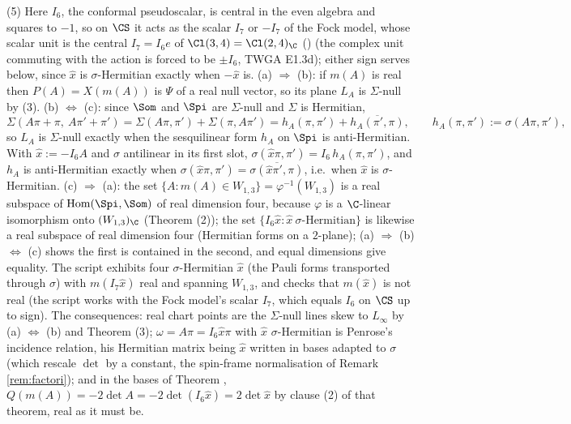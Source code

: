 (5) Here $I_6$, the conformal pseudoscalar, is central in the even algebra and squares to $-1$, so on $\CS$ it acts as the scalar $I_7$ or $-I_7$ of the Fock model, whose scalar unit is the central $I_7 = I_6e$ of $\Cl(3,4) = \Cl(2,4)_\C$ () (the complex unit commuting with the action is forced to be $\pm I_6$, TWGA E1.3d); either sign serves below, since $\hat x$ is $\sigma$-Hermitian exactly when $-\hat x$ is. (a) $\Rightarrow$ (b): if $m(A)$ is real then $P(A) = X(m(A))$ is $\Psi$ of a real null vector, so its plane $L_A$ is $\Sigma$-null by (3). (b) $\Leftrightarrow$ (c): since $\Som$ and $\Spi$ are $\Sigma$-null and $\Sigma$ is Hermitian,
\[
\Sigma(A\pi + \pi,\ A\pi' + \pi') = \Sigma(A\pi, \pi') + \Sigma(\pi, A\pi') = h_A(\pi,\pi') + \overline{h_A(\pi',\pi)}, \qquad h_A(\pi,\pi') := \sigma(A\pi, \pi'),
\]
so $L_A$ is $\Sigma$-null exactly when the sesquilinear form $h_A$ on $\Spi$ is anti-Hermitian. With $\hat x := -I_6A$ and $\sigma$ antilinear in its first slot, $\sigma(\hat x\pi, \pi') = I_6\,h_A(\pi,\pi')$, and $h_A$ is anti-Hermitian exactly when $\sigma(\hat x\pi,\pi') = \overline{\sigma(\hat x\pi',\pi)}$, i.e.\ when $\hat x$ is $\sigma$-Hermitian. (c) $\Rightarrow$ (a): the set $\{A : m(A) \in W_{1,3}\} = \varphi^{-1}(W_{1,3})$ is a real subspace of $\operatorname{Hom}(\Spi,\Som)$ of real dimension four, because $\varphi$ is a $\C$-linear isomorphism onto $(W_{1,3})_\C$ (Theorem (2)); the set $\{I_6\hat x : \hat x\ \sigma\text{-Hermitian}\}$ is likewise a real subspace of real dimension four (Hermitian forms on a $2$-plane); (a) $\Rightarrow$ (b) $\Leftrightarrow$ (c) shows the first is contained in the second, and equal dimensions give equality. The script exhibits four $\sigma$-Hermitian $\hat x$ (the Pauli forms transported through $\sigma$) with $m(I_7\hat x)$ real and spanning $W_{1,3}$, and checks that $m(\hat x)$ is not real (the script works with the Fock model's scalar $I_7$, which equals $I_6$ on $\CS$ up to sign). The consequences: real chart points are the $\Sigma$-null lines skew to $L_\infty$ by (a) $\Leftrightarrow$ (b) and Theorem (3); $\omega = A\pi = I_6\hat x\pi$ with $\hat x$ $\sigma$-Hermitian is Penrose's incidence relation, his Hermitian matrix being $\hat x$ written in bases adapted to $\sigma$ (which rescale $\det$ by a constant, the spin-frame normalisation of Remark \ref{rem:factori}); and in the bases of Theorem , $Q(m(A)) = -2\det A = -2\det(I_6\hat x) = 2\det\hat x$ by clause (2) of that theorem, real as it must be.
